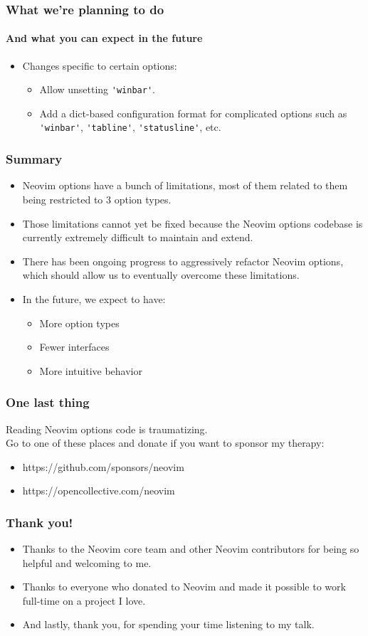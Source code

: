 \documentclass[10pt]{beamer}
\begin{document}
\begin{frame}
\frametitle{What we're planning to do}
\framesubtitle{And what you can expect in the future}
\begin{itemize}
    \item Changes specific to certain options:
    \begin{itemize}
        \item Allow unsetting \lstinline{'winbar'}.
        \item Add a dict-based configuration format for complicated options such as
            \lstinline{'winbar'}, \lstinline{'tabline'}, \lstinline{'statusline'}, etc.
    \end{itemize} 
\end{itemize}
\end{frame}
\begin{frame}
\frametitle{Summary}
\begin{itemize}
    \item Neovim options have a bunch of limitations, most of them related to them being restricted
        to 3 option types.
    \item Those limitations cannot yet be fixed because the Neovim options codebase is currently
        extremely difficult to maintain and extend.
    \item There has been ongoing progress to aggressively refactor Neovim options, which should
        allow us to eventually overcome these limitations.
    \item In the future, we expect to have:
    \begin{itemize}
       \item More option types
       \item Fewer interfaces
       \item More intuitive behavior
    \end{itemize}
\end{itemize}
\end{frame}
\begin{frame}
\frametitle{One last thing}
Reading Neovim options code is traumatizing.\\
Go to one of these places and donate if you want to sponsor my therapy:
\begin{itemize}
    \item https://github.com/sponsors/neovim
    \item https://opencollective.com/neovim
\end{itemize}
\end{frame}
\begin{frame}
\frametitle{Thank you!}
\begin{itemize}
    \item Thanks to the Neovim core team and other Neovim contributors for being so helpful and
        welcoming to me.
    \item Thanks to everyone who donated to Neovim and made it possible to work full-time on a
        project I love.
    \item And lastly, thank you, for spending your time listening to my talk.
\end{itemize}
\end{frame}
\end{document}
